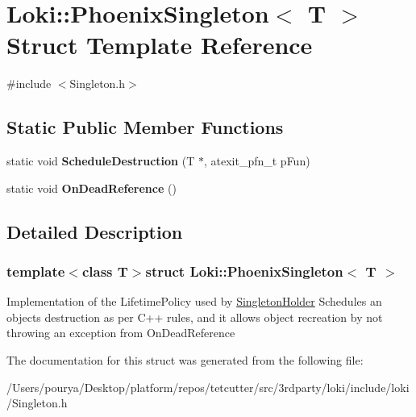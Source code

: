 \hypertarget{classLoki_1_1PhoenixSingleton}{}\section{Loki\+:\+:Phoenix\+Singleton$<$ T $>$ Struct Template Reference}
\label{classLoki_1_1PhoenixSingleton}


{\ttfamily \#include $<$Singleton.\+h$>$}

\subsection*{Static Public Member Functions}
\begin{DoxyCompactItemize}
\item 
\hypertarget{classLoki_1_1PhoenixSingleton_adca8841655ea2d2d39494f1773e1baa3}{}static void {\bfseries Schedule\+Destruction} (T $\ast$, atexit\+\_\+pfn\+\_\+t p\+Fun)\label{classLoki_1_1PhoenixSingleton_adca8841655ea2d2d39494f1773e1baa3}

\item 
\hypertarget{classLoki_1_1PhoenixSingleton_abd026bc7d753b645317c5aa9d62ed895}{}static void {\bfseries On\+Dead\+Reference} ()\label{classLoki_1_1PhoenixSingleton_abd026bc7d753b645317c5aa9d62ed895}

\end{DoxyCompactItemize}


\subsection{Detailed Description}
\subsubsection*{template$<$class T$>$struct Loki\+::\+Phoenix\+Singleton$<$ T $>$}

Implementation of the Lifetime\+Policy used by \hyperlink{classLoki_1_1SingletonHolder}{Singleton\+Holder} Schedules an object\textquotesingle{}s destruction as per C++ rules, and it allows object recreation by not throwing an exception from On\+Dead\+Reference 

The documentation for this struct was generated from the following file\+:\begin{DoxyCompactItemize}
\item 
/\+Users/pourya/\+Desktop/platform/repos/tetcutter/src/3rdparty/loki/include/loki/Singleton.\+h\end{DoxyCompactItemize}
